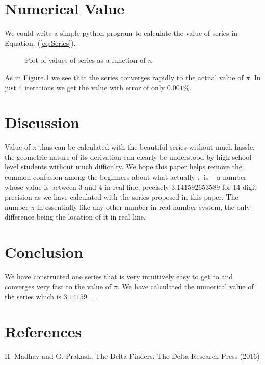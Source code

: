 \documentclass{jpconf}
\theoremstyle{definition} \newtheorem{Definition}{Def{\,}inition}
\begin{document}
\section{Numerical Value}
We could write a simple python program to calculate the value of series in Equation. (\ref{eq:Series}).

\begin{figure}[h!]
	\centering
	\scalebox{0.8}{}
	\caption{Plot of values of series as a function of $n$}
	\label{fig:PISeriesPlot}
\end{figure}
As in Figure.\ref{fig:PISeriesPlot} we see that the series converges rapidly to the actual value of $\pi$. In just 4 iterations we get the value with error of only $0.001\%$.
\section{Discussion}
Value of $\pi$ thus can be calculated with the beautiful series without much hassle, the geometric nature of its derivation can clearly be understood by high school level students without much difficulty.  We hope this paper helps remove the common confusion among the beginners about what actually $\pi$ is -- a number whose value is between $3$ and $4$ in real line, precisely $3.141592653589$ for 14 digit precision as we have calculated with the series proposed in this paper. The number $\pi$ in essentially like any  other number in real number system, the only difference being the location of it in real line. 

\section{Conclusion}
We have constructed one series that is very intuitively easy to get to and converges very fast to the value of $\pi$. We have calculated the numerical value of the series which is $3.14159...$ \cite{fat}.

\section*{References}
\begin{thebibliography}{99}
		H. Madhav and G. Prakash, The Delta Finders. The Delta Research Press (2016)
\end{thebibliography}
\end{document}
